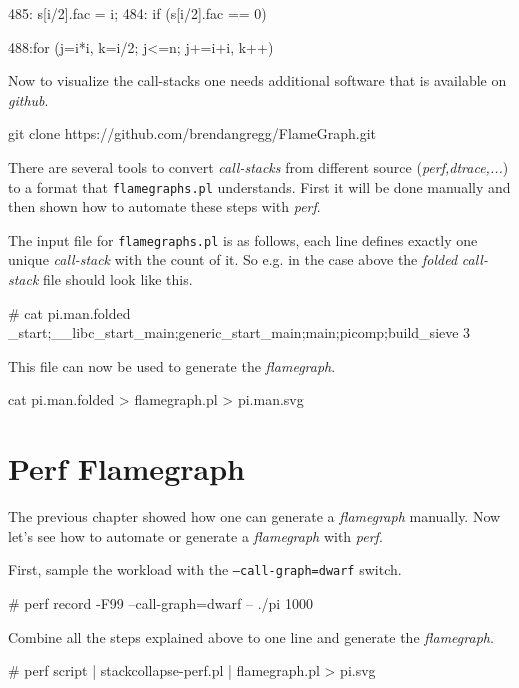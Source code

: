 485:   s[i/2].fac = i;                    484:  if (s[i/2].fac == 0) {              488:for (j=i*i, k=i/2; j<=n; j+=i+i, k++) {

\stoptyping

Now to visualize the call-stacks one needs additional software that is
available on {\em github}.

\starttyping
git clone https://github.com/brendangregg/FlameGraph.git
\stoptyping

There are several tools to convert {\em call-stacks} from different
source ({\em perf,dtrace,...}) to a format that {\tt flamegraphs.pl}
understands. First it will be done manually and then shown how to
automate these steps with {\em perf}.

The input file for {\tt flamegraphs.pl} is as follows, each line
defines exactly one unique {\em call-stack} with the count of it.
So e.g. in the case above the {\em folded} {\em call-stack} file
should look like this.

\starttyping
# cat pi.man.folded
_start;__libc_start_main;generic_start_main;main;picomp;build_sieve 3
\stoptyping

This file can now be used to generate the {\em flamegraph}.

\starttyping
cat pi.man.folded > flamegraph.pl > pi.man.svg
\stoptyping

\setupcaption [figure][location={bottom}]
\startplacefigure[title={Flamegraph of 3 {\em call-stack} samples}]
\stopplacefigure

\section{Perf Flamegraph}

The previous chapter showed how one can generate a {\em flamegraph} manually. Now
let's see how to automate or generate a {\em flamegraph} with {\em perf}.

First, sample the workload with the {\tt --call-graph=dwarf} switch.

\starttyping
# perf record -F99 --call-graph=dwarf -- ./pi 1000
\stoptyping

Combine all the steps explained above to one line and generate the {\em flamegraph}.

\starttyping
# perf script | stackcollapse-perf.pl | flamegraph.pl > pi.svg
\stoptyping


}}
